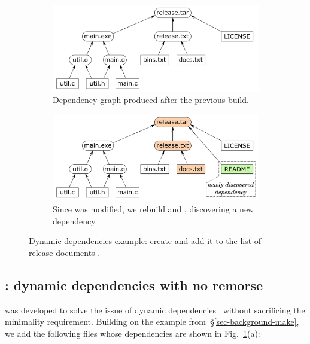 \begin{figure}[h]
\vspace{-2mm}
\begin{subfigure}[b]{0.90\linewidth}
\centerline{\includegraphics[scale=0.28]{fig/shake-example.pdf}}
\caption{Dependency graph produced after the previous build.}
\end{subfigure}
\begin{subfigure}[b]{0.90\linewidth}
\centerline{\includegraphics[scale=0.28]{fig/shake-example-rebuild.pdf}}
\caption{Since  was modified, we rebuild  and
, discovering a new dependency.}
\end{subfigure}
\vspace{-2mm}
\caption{Dynamic dependencies example: create  and add it to the
list of release documents .\label{fig-shake}}
\vspace{-4mm}
\end{figure}

\subsection{\Shake: dynamic dependencies with no remorse}
\label{sec-background-shake}

\Shake was developed to solve the issue of dynamic
dependencies~\cite{mitchell2012shake} without sacrificing
the minimality requirement. Building on the \Make example
from~\S\ref{sec-background-make}, we add the following files whose
dependencies are shown in Fig.~\ref{fig-shake}(a):

